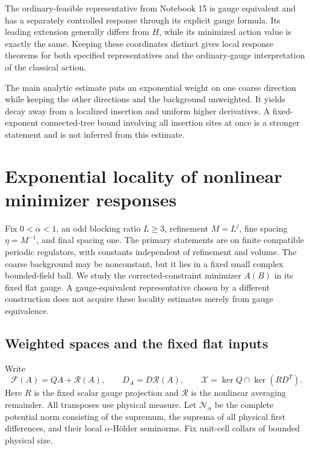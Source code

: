 \documentclass[11pt]{article}
\theoremstyle{remark}
\newcommand{\norm}[1]{\left\|#1\right\|}
\begin{document}
The ordinary-feasible representative from Notebook 15 is gauge
equivalent and has a separately controlled response through its
explicit gauge formula. Its leading extension generally differs
from $H$, while its minimized action value is exactly the same.
Keeping these coordinates distinct gives local response theorems
for both specified representatives and the ordinary-gauge
interpretation of the classical action.

The main analytic estimate puts an exponential weight on one
coarse direction while keeping the other directions and the
background unweighted. It yields decay away from a localized
insertion and uniform higher derivatives. A fixed-exponent
connected-tree bound involving all insertion sites at once is
a stronger statement and is not inferred from this estimate.



\section{Exponential locality of nonlinear minimizer responses}
\label{wr-section}

Fix $0<\alpha<1$, an odd blocking ratio $L\ge3$, refinement
$M=L^j$, fine spacing $\eta=M^{-1}$, and final spacing one.
The primary statements are on finite compatible periodic
regulators, with constants independent of refinement and volume.
The coarse background may be nonconstant, but it lies in a fixed
small complex bounded-field ball. We study the corrected-constraint
minimizer $A(B)$ in its fixed flat gauge. A gauge-equivalent
representative chosen by a different construction does not acquire
these locality estimates merely from gauge equivalence.

\subsection{Weighted spaces and the fixed flat inputs}
\label{wr-spaces}

Write
\[
 \mathcal F(A)=QA+\mathcal R(A),\qquad
 D_A=D\mathcal R(A),\qquad
 \mathcal X=\ker Q\cap\ker(RD^T).
\]
Here $R$ is the fixed scalar gauge projection and
$\mathcal R$ is the nonlinear averaging remainder. All transposes
use physical measure. Let $\mathcal N_\alpha$ be the complete
potential norm consisting of the supremum, the suprema of all
physical first differences, and their local $\alpha$-H\"older
seminorms. Fix unit-cell collars of bounded physical size.
\end{document}

